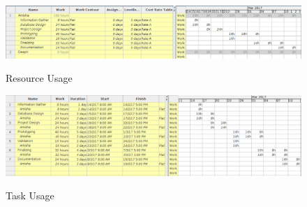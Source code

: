 \begin{itemize}
\begin{figure}[!ht]
\centering
\includegraphics[width=1\linewidth]{input/images/am_res_usage.png}
\label{fig:image1}
\caption{Resource Usage}
\end{figure}



\begin{figure}[!ht]
\centering
\includegraphics[width=1\linewidth]{input/images/am_task_usage.png}
\label{fig:image1}
\caption{Task Usage}
\end{figure}
\end{itemize}
